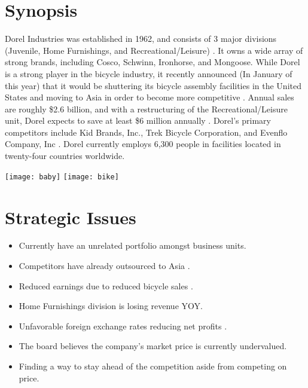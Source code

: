 
\begingroup
\let\clearpage\relax
\let\cleardoublepage\relax
\let\cleardoublepage\relax

\chapter*{Synopsis}
Dorel Industries was established in 1962, and consists of 3 major divisions (Juvenile, Home Furnishings, and Recreational/Leisure) \cite{DorelIndustries2013}.  It owns a wide array of strong brands, including Cosco, Schwinn, Ironhorse, and Mongoose.  While Dorel is a strong player in the bicycle industry, it recently announced (In January of this year) that it would be shuttering its bicycle assembly facilities in the United States and moving to Asia in order to become more competitive \cite{Marotte2014}.  Annual sales are roughly \$2.6 billion, and with a restructuring of the Recreational/Leisure unit, Dorel expects to save at least \$6 million annually \cite{Carpiet2014}.  Dorel’s primary competitors include Kid Brands, Inc., Trek Bicycle Corporation, and Evenflo Company, Inc \cite{Hoovers2014}.  Dorel currently employs 6,300 people in facilities located in twenty-four countries worldwide.

\vfill
\centerline{{\texttt{[image: baby]}} 
{\texttt{[image: bike]}}}
\vfill
{}
\chapter*{Strategic Issues}

\begin{itemize}
  \item Currently have an unrelated portfolio amongst business units.
  \item Competitors have already outsourced to Asia \cite{VoiceofAmerica2009}.
  \item Reduced earnings due to reduced bicycle sales \cite{Symon2014}.
  \item Home Furnishings division is losing revenue YOY.
  \item Unfavorable foreign exchange rates reducing net profits \cite{Symon2014}.
  \item The board believes the company’s market price is currently undervalued.
  \item Finding a way to stay ahead of the competition aside from competing on price.
\end{itemize}

